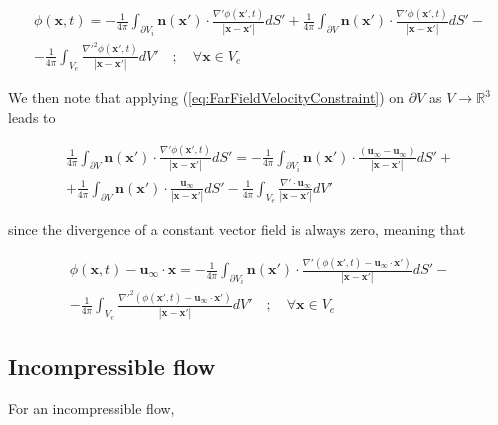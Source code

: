 \documentclass{article}
\begin{document}
\begin{multline*}
	\phi(\mathbf{x}, t) = - \frac{1}{4 \pi} \int_{\partial V_i} \mathbf{n}(
	\mathbf{x}') \cdot \frac{\nabla' \phi(\mathbf{x}', t)}{|\mathbf{x} -
	\mathbf{x}'|} dS' + \frac{1}{4 \pi} \int_{\partial V} \mathbf{n}(
	\mathbf{x}') \cdot \frac{\nabla' \phi(\mathbf{x}', t)}{|\mathbf{x} -
	\mathbf{x}'|} dS' - \\
	- \frac{1}{4 \pi} \int_{V_e} \frac{\nabla'^2 \phi(\mathbf{x}', t)}{|
	\mathbf{x} - \mathbf{x}'|} dV' \quad ; \quad \forall \mathbf{x} \in V_e
\end{multline*}

We then note that applying (\ref{eq:FarFieldVelocityConstraint}) on $\partial V$
as $V \rightarrow \mathbb{R}^3$ leads to

\begin{multline*}
	\frac{1}{4 \pi} \int_{\partial V} \mathbf{n}(\mathbf{x}') \cdot \frac{
	\nabla' \phi(\mathbf{x}', t)}{|\mathbf{x} - \mathbf{x}'|} dS' = - \frac{1}{4
	\pi} \int_{\partial V_i} \mathbf{n}(\mathbf{x}') \cdot \frac{(\mathbf{u}_{
	\infty} - \mathbf{u}_{\infty})}{|\mathbf{x} - \mathbf{x}'|} dS' + \\
	+ \frac{1}{4 \pi} \int_{\partial V} \mathbf{n}(\mathbf{x}') \cdot \frac{
	\mathbf{u}_{\infty}}{|\mathbf{x} - \mathbf{x}'|} dS' - \frac{1}{4 \pi}
	\int_{V_e} \frac{\nabla' \cdot \mathbf{u}_{\infty}}{|\mathbf{x} -
	\mathbf{x}'|} dV'
\end{multline*}

since the divergence of a constant vector field is always zero, meaning that

\begin{multline}
\label{eq:HelmholtzDecomposedPhiInVe}
	\phi(\mathbf{x}, t) - \mathbf{u}_{\infty} \cdot \mathbf{x} = - \frac{1}{4
	\pi} \int_{\partial V_i} \mathbf{n}(\mathbf{x}') \cdot \frac{\nabla' \left(
	\phi(\mathbf{x}', t) - \mathbf{u}_{\infty} \cdot \mathbf{x}' \right)}{|
	\mathbf{x} - \mathbf{x}'|} dS' - \\
	- \frac{1}{4 \pi} \int_{V_e} \frac{\nabla'^2 \left( \phi(\mathbf{x}', t) -
	\mathbf{u}_{\infty} \cdot \mathbf{x}' \right)}{|\mathbf{x} - \mathbf{x}'|}
	dV' \quad ; \quad \forall \mathbf{x} \in V_e
\end{multline}

\subsection{Incompressible flow}

For an incompressible flow,
\end{document}
